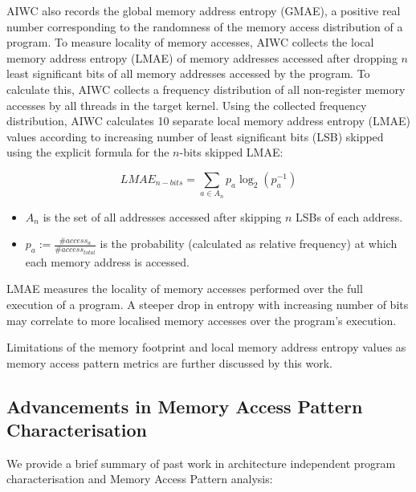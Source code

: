 \documentclass[review=false, sigchi]{acmart}
\begin{document}
	AIWC also records the global memory address entropy (GMAE), a positive real number corresponding to the randomness of the memory access distribution of a program. To measure locality of memory accesses, AIWC collects the local memory address entropy (LMAE) of memory addresses accessed after dropping $n$ least significant bits of all memory addresses accessed by the program. To calculate this, AIWC collects a frequency distribution of all non-register memory accesses by all threads in the target kernel. Using the collected frequency distribution, AIWC calculates 10 separate local memory address entropy (LMAE) values according to increasing number of least significant bits (LSB) skipped using
	the explicit formula for the $n$-bits skipped LMAE:
	
	\begin{equation}
	LMAE_{n-bits} = \sum_{a \in A_n}p_a \log_2(p_a^{-1})
	\end{equation}
	
	\begin{itemize}
		\item $A_n$ is the set of all addresses accessed after skipping $n$ LSBs of each address.
		\item $p_a := \frac{\#access_a}{\#access_{total}}$ is the probability (calculated as relative frequency) at which each memory address is accessed.
	\end{itemize}
	
	LMAE measures the locality of memory accesses performed over the full execution of a program. A steeper drop in entropy with increasing number of bits may correlate to more localised memory accesses over the program's execution.
	
	Limitations of the memory footprint and local memory address entropy values as memory access pattern metrics are further discussed by this work. %
	
	\subsection{Advancements in Memory Access Pattern Characterisation}
	
	We provide a brief summary of past work in architecture independent program characterisation and Memory Access Pattern analysis:
	
\end{document}
